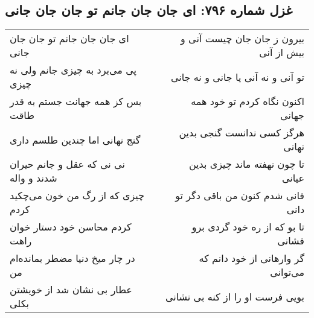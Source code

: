\begin{center}
\section*{غزل شماره ۷۹۶: ای جان جان جانم تو جان جان جانی}
\label{sec:796}
\begin{longtable}{l p{0.5cm} r}
ای جان جان جانم تو جان جان جانی
&&
بیرون ز جان جان چیست آنی و بیش از آنی
\\
پی می‌برد به چیزی جانم ولی نه چیزی
&&
تو آنی و نه آنی یا جانی و نه جانی
\\
بس کز همه جهانت جستم به قدر طاقت
&&
اکنون نگاه کردم تو خود همه جهانی
\\
گنج نهانی اما چندین طلسم داری
&&
هرگز کسی ندانست گنجی بدین نهانی
\\
نی نی که عقل و جانم حیران شدند و واله
&&
تا چون نهفته ماند چیزی بدین عیانی
\\
چیزی که از رگ من خون می‌چکید کردم
&&
فانی شدم کنون من باقی دگر تو دانی
\\
کردم محاسن خود دستار خوان راهت
&&
تا بو که از ره خود گردی برو فشانی
\\
در چار میخ دنیا مضطر بمانده‌ام من
&&
گر وارهانی از خود دانم که می‌توانی
\\
عطار بی نشان شد از خویشتن بکلی
&&
بویی فرست او را از کنه بی نشانی
\\
\end{longtable}
\end{center}
